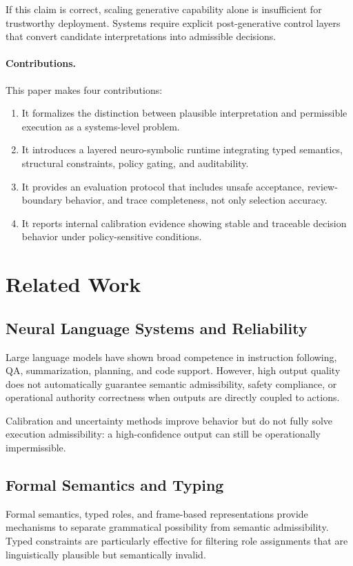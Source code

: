 \documentclass[11pt,a4paper]{article}
\begin{document}
If this claim is correct, scaling generative capability alone is insufficient for trustworthy deployment. Systems require explicit post-generative control layers that convert candidate interpretations into admissible decisions.

\paragraph{Contributions.} This paper makes four contributions:
\begin{enumerate}[leftmargin=*, itemsep=2pt]
  \item It formalizes the distinction between plausible interpretation and permissible execution as a systems-level problem.
  \item It introduces a layered neuro-symbolic runtime integrating typed semantics, structural constraints, policy gating, and auditability.
  \item It provides an evaluation protocol that includes unsafe acceptance, review-boundary behavior, and trace completeness, not only selection accuracy.
  \item It reports internal calibration evidence showing stable and traceable decision behavior under policy-sensitive conditions.
\end{enumerate}

\section{Related Work}

\subsection{Neural Language Systems and Reliability}
Large language models have shown broad competence in instruction following, QA, summarization, planning, and code support. However, high output quality does not automatically guarantee semantic admissibility, safety compliance, or operational authority correctness when outputs are directly coupled to actions.

Calibration and uncertainty methods improve behavior but do not fully solve execution admissibility: a high-confidence output can still be operationally impermissible.

\subsection{Formal Semantics and Typing}
Formal semantics, typed roles, and frame-based representations provide mechanisms to separate grammatical possibility from semantic admissibility. Typed constraints are particularly effective for filtering role assignments that are linguistically plausible but semantically invalid.
\end{document}
